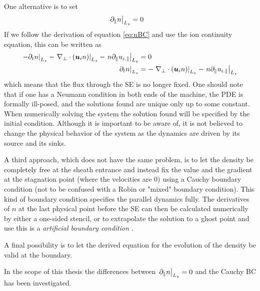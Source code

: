 One alternative is to set
%
\begin{align*}
    \left. \partial_\| n \right|_{L_z} &= 0
\end{align*}
%
If we follow the derivation of equation \ref{eq:nBC} and use the ion continuity equation, this can be written as
%
\begin{align*}
    \left.- \partial_tn \right|_{L_z}- \left.\nabla_\perp\cdot\left(\boldsymbol{u}_{i} n \right)\right|_{L_z}
    -\left.n \partial_\| u_{i.\|}\right|_{L_z}
    &= 0\\
    \left.\partial_tn \right|_{L_z}&=  - \left.\nabla_\perp\cdot\left(\boldsymbol{u}_{i} n \right)\right|_{L_z}-
    \left.n \partial_\| u_{i.\|}\right|_{L_z}
\end{align*}
%
which means that the flux through the SE is no longer fixed.
One should note that if one has a Neumann condition in both ends of the machine, the PDE is formally ill-posed, and the solutions found are unique only up to some constant.
When numerically solving the system the solution found will be specified by the initial condition.
Although it is important to be aware of, it is not believed to change the physical behavior of the system as the dynamics are driven by its source and its sinks.

A third approach, which does not have the same problem, is to let the density be completely free at the sheath entrance and instead fix the value and the gradient at the stagnation point (where the velocities are $0$) using a Cauchy boundary condition (not to be confused with a Robin or "mixed" boundary condition).
This kind of boundary condition specifies the parallel dynamics fully.
The derivatives of $n$ at the last physical point before the SE can then be calculated numerically by either a one-sided stencil, or to extrapolate the solution to a ghost point and use this is a \emph{artificial boundary condition} \cite{Leveque2007book}.

A final possibility is to let the derived equation for the evolution of the density be valid at the boundary.

In the scope of this thesis the differences between $\left. \partial_\| n \right|_{L_z} = 0$ and the Cauchy BC has been investigated.



